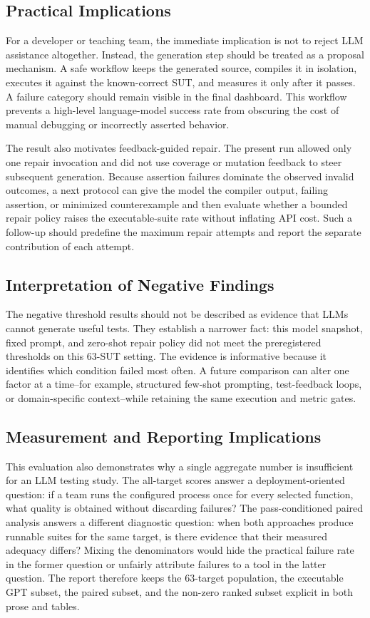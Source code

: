 ﻿\documentclass[conference]{IEEEtran}
\begin{document}
\subsection{Practical Implications}
For a developer or teaching team, the immediate implication is not to reject LLM assistance altogether. Instead, the generation step should be treated as a proposal mechanism. A safe workflow keeps the generated source, compiles it in isolation, executes it against the known-correct SUT, and measures it only after it passes. A failure category should remain visible in the final dashboard. This workflow prevents a high-level language-model success rate from obscuring the cost of manual debugging or incorrectly asserted behavior.

The result also motivates feedback-guided repair. The present run allowed only one repair invocation and did not use coverage or mutation feedback to steer subsequent generation. Because assertion failures dominate the observed invalid outcomes, a next protocol can give the model the compiler output, failing assertion, or minimized counterexample and then evaluate whether a bounded repair policy raises the executable-suite rate without inflating API cost. Such a follow-up should predefine the maximum repair attempts and report the separate contribution of each attempt.

\subsection{Interpretation of Negative Findings}
The negative threshold results should not be described as evidence that LLMs cannot generate useful tests. They establish a narrower fact: this model snapshot, fixed prompt, and zero-shot repair policy did not meet the preregistered thresholds on this 63-SUT setting. The evidence is informative because it identifies which condition failed most often. A future comparison can alter one factor at a time--for example, structured few-shot prompting, test-feedback loops, or domain-specific context--while retaining the same execution and metric gates.

\subsection{Measurement and Reporting Implications}
This evaluation also demonstrates why a single aggregate number is insufficient for an LLM testing study. The all-target scores answer a deployment-oriented question: if a team runs the configured process once for every selected function, what quality is obtained without discarding failures? The pass-conditioned paired analysis answers a different diagnostic question: when both approaches produce runnable suites for the same target, is there evidence that their measured adequacy differs? Mixing the denominators would hide the practical failure rate in the former question or unfairly attribute failures to a tool in the latter question. The report therefore keeps the 63-target population, the executable GPT subset, the paired subset, and the non-zero ranked subset explicit in both prose and tables.
\end{document}
